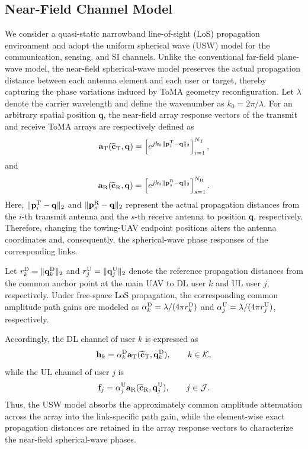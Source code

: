 \documentclass[letterpaper,journal]{IEEEtran}
\begin{document}
\subsection{Near-Field Channel Model}
\label{subsec:channel_model}

We consider a quasi-static narrowband line-of-sight (LoS) propagation environment and adopt the uniform spherical wave (USW) model for the communication, sensing, and SI channels. Unlike the conventional far-field plane-wave model, the near-field spherical-wave model preserves the actual propagation distance between each antenna element and each user or target, thereby capturing the phase variations induced by ToMA geometry reconfiguration. Let $\lambda$ denote the carrier wavelength and define the wavenumber as $k_0=2\pi/\lambda$. For an arbitrary spatial position $\mathbf q$, the near-field array response vectors of the transmit and receive ToMA arrays are respectively defined as
\begin{equation}
\mathbf a_{\rm T}
(\widetilde{\mathbf c}_{\rm T},\mathbf q)
=
\left[
e^{j k_0\|\mathbf p_i^{\rm T}-\mathbf q\|_2}
\right]_{i=1}^{N_{\rm T}},
\label{eq:tx_nf_response}
\end{equation}
and
\begin{equation}
\mathbf a_{\rm R}
(\widetilde{\mathbf c}_{\rm R},\mathbf q)
=
\left[
e^{j k_0\|\mathbf p_s^{\rm R}-\mathbf q\|_2}
\right]_{s=1}^{N_{\rm R}}.
\label{eq:rx_nf_response}
\end{equation}
Here, $\|\mathbf p_i^{\rm T}-\mathbf q\|_2$ and $\|\mathbf p_s^{\rm R}-\mathbf q\|_2$ represent the actual propagation distances from the $i$-th transmit antenna and the $s$-th receive antenna to position $\mathbf q$, respectively. Therefore, changing the towing-UAV endpoint positions alters the antenna coordinates and, consequently, the spherical-wave phase responses of the corresponding links.

Let $r_k^{\rm D}=\|\mathbf q_k^{\rm D}\|_2$ and
$r_j^{\rm U}=\|\mathbf q_j^{\rm U}\|_2$ denote the reference
propagation distances from the common anchor point at the main UAV
to DL user $k$ and UL user $j$, respectively. Under free-space LoS
propagation, the corresponding common amplitude path gains are modeled
as $\alpha_k^{\rm D}=\lambda/(4\pi r_k^{\rm D})$ and
$\alpha_j^{\rm U}=\lambda/(4\pi r_j^{\rm U})$, respectively.

Accordingly, the DL channel of user $k$ is expressed as
\begin{equation}
\mathbf h_k
=
\alpha_k^{\rm D}
\mathbf a_{\rm T}
(\widetilde{\mathbf c}_{\rm T},\mathbf q_k^{\rm D}),
\qquad
k\in\mathcal K,
\label{eq:dl_channel}
\end{equation}
while the UL channel of user $j$ is
\begin{equation}
\mathbf f_j
=
\alpha_j^{\rm U}
\mathbf a_{\rm R}
(\widetilde{\mathbf c}_{\rm R},\mathbf q_j^{\rm U}),
\qquad
j\in\mathcal J.
\label{eq:ul_channel}
\end{equation}
Thus, the USW model absorbs the approximately common amplitude
attenuation across the array into the link-specific path gain, while
the element-wise exact propagation distances are retained in the array
response vectors to characterize the near-field spherical-wave phases.
\end{document}
